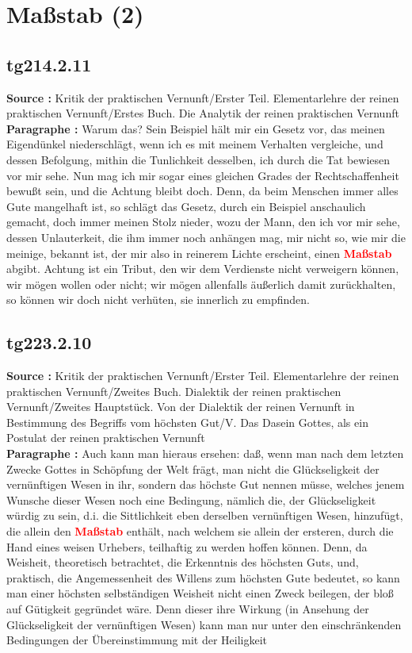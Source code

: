 \documentclass[a4paper,12pt,twoside]{book}
\newcommand{\match}[1]{\textcolor{red}{\textbf{#1}}}
\newcommand{\unnumberedsection}[1]{
	\section*{#1}
	\addcontentsline{toc}{section}{#1}
	\markright{#1}
}
\begin{document}
	\unnumberedsection{Maßstab (2)} 
	\subsection*{tg214.2.11} 
	\textbf{Source : }Kritik der praktischen Vernunft/Erster Teil. Elementarlehre der reinen praktischen Vernunft/Erstes Buch. Die Analytik der reinen praktischen Vernunft\\  
	
	\noindent\textbf{Paragraphe : }
	Warum das? Sein Beispiel hält mir ein Gesetz vor, das meinen Eigendünkel niederschlägt, wenn ich es mit meinem Verhalten vergleiche, und dessen Befolgung, mithin die Tunlichkeit desselben, ich durch die Tat bewiesen vor mir sehe. Nun mag ich mir sogar eines gleichen Grades der Rechtschaffenheit bewußt sein, und die Achtung bleibt doch. Denn, da beim Menschen immer alles Gute mangelhaft ist, so schlägt das Gesetz, durch ein Beispiel anschaulich gemacht, doch immer meinen Stolz nieder, wozu der Mann, den ich vor mir sehe, dessen Unlauterkeit, die ihm immer noch anhängen mag, mir nicht so, wie mir die meinige, bekannt ist, der mir also in reinerem Lichte erscheint, einen \match{Maßstab} abgibt. Achtung ist ein Tribut, den wir dem Verdienste nicht verweigern können, wir mögen wollen oder nicht; wir mögen allenfalls äußerlich damit zurückhalten, so können wir doch nicht verhüten, sie innerlich zu empfinden. 
	
	\subsection*{tg223.2.10} 
	\textbf{Source : }Kritik der praktischen Vernunft/Erster Teil. Elementarlehre der reinen praktischen Vernunft/Zweites Buch. Dialektik der reinen praktischen Vernunft/Zweites Hauptstück. Von der Dialektik der reinen Vernunft in Bestimmung des Begriffs vom höchsten Gut/V. Das Dasein Gottes, als ein Postulat der reinen praktischen Vernunft\\  
	
	\noindent\textbf{Paragraphe : }Auch kann man hieraus ersehen: daß, wenn man nach dem letzten Zwecke Gottes in Schöpfung der Welt frägt, man nicht die Glückseligkeit der vernünftigen Wesen in ihr, sondern das höchste Gut nennen müsse, welches jenem Wunsche dieser Wesen noch eine Bedingung, nämlich die, der Glückseligkeit würdig zu sein, d.i. die Sittlichkeit eben derselben vernünftigen Wesen, hinzufügt, die allein den \match{Maßstab} enthält, nach welchem sie allein der ersteren, durch die Hand eines weisen Urhebers, teilhaftig zu werden hoffen können. Denn, da Weisheit, theoretisch betrachtet, die Erkenntnis des höchsten Guts, und, praktisch, die Angemessenheit des Willens zum höchsten Gute bedeutet, so kann man einer höchsten selbständigen Weisheit nicht einen Zweck beilegen, der bloß auf Gütigkeit gegründet wäre. Denn dieser ihre Wirkung (in Ansehung der Glückseligkeit der vernünftigen Wesen)  kann man nur unter den einschränkenden Bedingungen der Übereinstimmung mit der Heiligkeit
	
\end{document}
